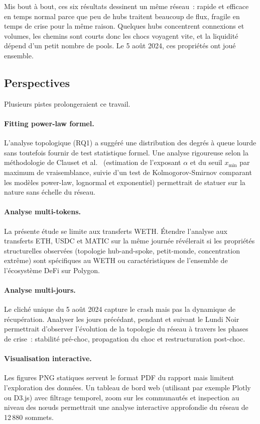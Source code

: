 Mis bout \`a bout, ces six r\'esultats dessinent un m\^eme r\'eseau~: rapide et
efficace en temps normal parce que peu de hubs traitent beaucoup de flux,
fragile en temps de crise pour la m\^eme raison. Quelques hubs concentrent
connexions et volumes, les chemins sont courts donc les chocs voyagent vite,
et la liquidit\'e d\'epend d'un petit nombre de pools. Le 5 ao\^ut 2024, ces
propri\'et\'es ont jou\'e ensemble.

\subsection{Perspectives}
\label{subsec:perspectives}

Plusieurs pistes prolongeraient ce travail.

\paragraph{Fitting power-law formel.}
L'analyse topologique (RQ1) a sugg\'er\'e une distribution des degr\'es \`a
queue lourde sans toutefois fournir de test statistique formel. Une analyse
rigoureuse selon la m\'ethodologie de Clauset et
al.~\cite{clauset2009powerlaw} (estimation de l'exposant $\alpha$ et du
seuil $x_{\min}$ par maximum de vraisemblance, suivie d'un test de
Kolmogorov-Smirnov comparant les mod\`eles power-law, lognormal et
exponentiel) permettrait de statuer sur la nature sans \'echelle du
r\'eseau.

\paragraph{Analyse multi-tokens.}
La pr\'esente \'etude se limite aux transferts WETH. \'Etendre l'analyse
aux transferts ETH, USDC et MATIC sur la m\^eme journ\'ee r\'ev\'elerait si
les propri\'et\'es structurelles observ\'ees (topologie hub-and-spoke,
petit-monde, concentration extr\^eme) sont sp\'ecifiques au WETH ou
caract\'eristiques de l'ensemble de l'\'ecosyst\`eme DeFi sur Polygon.

\paragraph{Analyse multi-jours.}
Le clich\'e unique du 5 ao\^ut 2024 capture le crash mais pas la
dynamique de r\'ecup\'eration. Analyser les jours pr\'ec\'edant, pendant et
suivant le Lundi Noir permettrait d'observer l'\'evolution de la topologie
du r\'eseau \`a travers les phases de crise~: stabilit\'e pr\'e-choc,
propagation du choc et restructuration post-choc.

\paragraph{Visualisation interactive.}
Les figures PNG statiques servent le format PDF du rapport mais limitent
l'exploration des donn\'ees. Un tableau de bord web (utilisant par exemple
Plotly ou D3.js) avec filtrage temporel, zoom sur les communaut\'es et
inspection au niveau des n\oe{}uds permettrait une analyse interactive
approfondie du r\'eseau de 12\,880 sommets.
